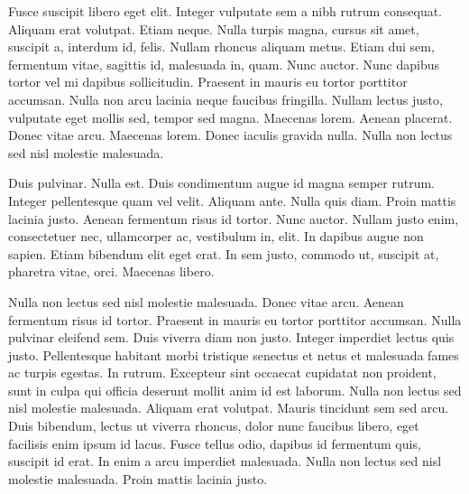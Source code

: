 Fusce suscipit libero eget elit. Integer vulputate sem a nibh rutrum consequat. Aliquam erat volutpat. Etiam neque. Nulla turpis magna, cursus sit amet, suscipit a, interdum id, felis. Nullam rhoncus aliquam metus. Etiam dui sem, fermentum vitae, sagittis id, malesuada in, quam. Nunc auctor. Nunc dapibus tortor vel mi dapibus sollicitudin. Praesent in mauris eu tortor porttitor accumsan. Nulla non arcu lacinia neque faucibus fringilla. Nullam lectus justo, vulputate eget mollis sed, tempor sed magna. Maecenas lorem. Aenean placerat. Donec vitae arcu. Maecenas lorem. Donec iaculis gravida nulla. Nulla non lectus sed nisl molestie malesuada.

Duis pulvinar. Nulla est. Duis condimentum augue id magna semper rutrum. Integer pellentesque quam vel velit. Aliquam ante. Nulla quis diam. Proin mattis lacinia justo. Aenean fermentum risus id tortor. Nunc auctor. Nullam justo enim, consectetuer nec, ullamcorper ac, vestibulum in, elit. In dapibus augue non sapien. Etiam bibendum elit eget erat. In sem justo, commodo ut, suscipit at, pharetra vitae, orci. Maecenas libero.

Nulla non lectus sed nisl molestie malesuada. Donec vitae arcu. Aenean fermentum risus id tortor. Praesent in mauris eu tortor porttitor accumsan. Nulla pulvinar eleifend sem. Duis viverra diam non justo. Integer imperdiet lectus quis justo. Pellentesque habitant morbi tristique senectus et netus et malesuada fames ac turpis egestas. In rutrum. Excepteur sint occaecat cupidatat non proident, sunt in culpa qui officia deserunt mollit anim id est laborum. Nulla non lectus sed nisl molestie malesuada. Aliquam erat volutpat. Mauris tincidunt sem sed arcu. Duis bibendum, lectus ut viverra rhoncus, dolor nunc faucibus libero, eget facilisis enim ipsum id lacus. Fusce tellus odio, dapibus id fermentum quis, suscipit id erat. In enim a arcu imperdiet malesuada. Nulla non lectus sed nisl molestie malesuada. Proin mattis lacinia justo.


